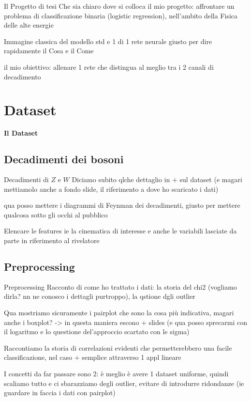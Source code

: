 \documentclass{beamer}
\begin{document}
\begin{frame}{Il Progetto di tesi}
  Che sia chiaro dove si colloca il mio progetto:
  affrontare un problema di classificazione binaria (logistic regression), nell'ambito della Fisica delle alte energie

  Immagine classica del modello std e 1 di 1 rete neurale giusto per dire rapidamente il Cosa e il Come

  il mio obiettivo: allenare 1 rete che distingua al meglio tra i 2 canali di decadimento

\end{frame}

\section{Dataset}
\begin{frame}
  \centering
  \Huge\bfseries
  Il Dataset
\end{frame}

\subsection{Decadimenti dei bosoni}
\begin{frame}{Decadimenti di $Z$ e $W$}
  Diciamo subito qlche dettaglio in $+$ sul dataset (e magari mettiamolo anche a fondo slide, il riferimento a dove ho scaricato i dati)

  qua posso mettere i diagrammi di Feynman dei decadimenti, giusto per mettere qualcosa sotto gli occhi al pubblico

  Elencare le features ie la cinematica di interesse e anche le variabili lasciate da parte in riferimento al rivelatore

\end{frame}

\subsection{Preprocessing}
\begin{frame}{Preprocessing}
  Racconto di come ho trattato i dati: la storia del chi2 (vogliamo dirla? nn ne conosco i dettagli purtroppo), la qstione dgli outlier

  Qua mostriamo sicuramente i pairplot che sono la cosa più indicativa, magari anche i boxplot? -> in questa maniera escono $+$ slides (e qua posso sprecarmi con il logaritmo e lo questione del'approccio scartato con le sigma)
  
  Raccontiamo la storia di correlazioni evidenti che permetterebbero una facile classificazione, nel caso $+$ semplice attraverso 1 appl lineare

  I concetti da far passare sono 2: è meglio è avere 1 dataset uniforme, quindi scaliamo tutto e ci sbarazziamo degli outlier, evitare di introdurre ridondanze (ie guardare in faccia i dati con pairplot)
\end{frame}
\end{document}
